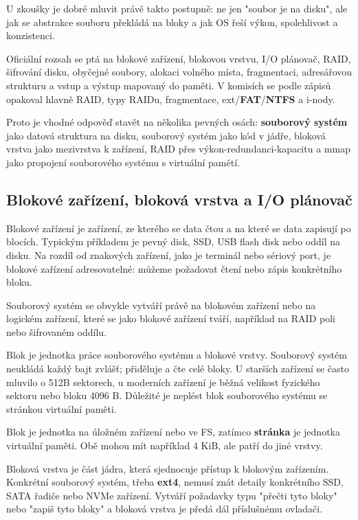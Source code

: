 \documentclass[11pt,a4paper]{article}
\begin{document}
U zkoušky je dobré mluvit právě takto postupně: ne jen "soubor je na disku", ale jak se abstrakce souboru překládá na bloky a jak OS řeší výkon, spolehlivost a konzistenci.

Oficiální rozsah se ptá na blokové zařízení, blokovou vrstvu, I/O plánovač, RAID, šifrování disku, obyčejné soubory, alokaci volného místa, fragmentaci, adresářovou strukturu a vstup a výstup mapovaný do paměti. V komisích se podle zápisů opakoval hlavně RAID, typy RAIDu, fragmentace, ext/\textbf{FAT}/\textbf{NTFS} a i-nody.

Proto je vhodné odpověď stavět na několika pevných osách: \textbf{souborový systém} jako datová struktura na disku, souborový systém jako kód v jádře, bloková vrstva jako mezivrstva k zařízení, RAID přes výkon-redundanci-kapacitu a mmap jako propojení souborového systému s virtuální pamětí.

\subsection*{Blokové zařízení, bloková vrstva a I/O plánovač}

Blokové zařízení je zařízení, ze kterého se data čtou a na které se data zapisují po blocích. Typickým příkladem je pevný disk, SSD, USB flash disk nebo oddíl na disku. Na rozdíl od znakových zařízení, jako je terminál nebo sériový port, je blokové zařízení adresovatelné: můžeme požadovat čtení nebo zápis konkrétního bloku.

Souborový systém se obvykle vytváří právě na blokovém zařízení nebo na logickém zařízení, které se jako blokové zařízení tváří, například na RAID poli nebo šifrovaném oddílu.

Blok je jednotka práce souborového systému a blokové vrstvy. Souborový systém neukládá každý bajt zvlášť; přiděluje a čte celé bloky. U starších zařízení se často mluvilo o 512B sektorech, u moderních zařízení je běžná velikost fyzického sektoru nebo bloku 4096 B. Důležité je neplést blok souborového systému se stránkou virtuální paměti.

Blok je jednotka na úložném zařízení nebo ve FS, zatímco \textbf{stránka} je jednotka virtuální paměti. Obě mohou mít například 4 KiB, ale patří do jiné vrstvy.

Bloková vrstva je část jádra, která sjednocuje přístup k blokovým zařízením. Konkrétní souborový systém, třeba \textbf{ext4}, nemusí znát detaily konkrétního SSD, SATA řadiče nebo NVMe zařízení. Vytváří požadavky typu "přečti tyto bloky" nebo "zapiš tyto bloky" a bloková vrstva je předá dál příslušnému ovladači.
\end{document}
